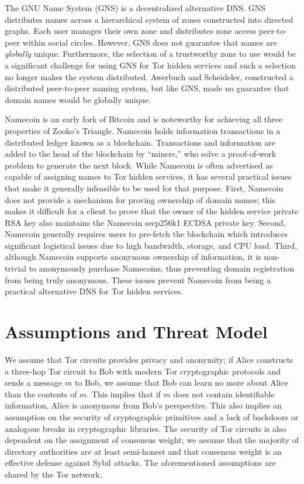 \documentclass[USenglish,oneside,twocolumn]{article}
\begin{document}
The GNU Name System \cite{wachs2014censorship} (GNS) is a decentralized alternative DNS. GNS distributes names across a hierarchical system of zones constructed into directed graphs. Each user manages their own zone and distributes zone access peer-to-peer within social circles. However, GNS does not guarantee that names are \emph{globally} unique. Furthermore, the selection of a trustworthy zone to use would be a significant challenge for using GNS for Tor hidden services and such a selection no longer makes the system distributed. Awerbuch and Scheideler, \cite{awerbuch2004group} constructed a distributed peer-to-peer naming system, but like GNS, made no guarantee that domain names would be globally unique.

Namecoin \cite{NamecoinHome} is an early fork of Bitcoin \cite{nakamoto2008bitcoin} and is noteworthy for achieving all three properties of Zooko's Triangle. Namecoin holds information transactions in a distributed ledger known as a blockchain. Transactions and information are added to the head of the blockchain by ``miners,'' who solve a proof-of-work problem to generate the next block. While Namecoin is often advertised as capable of assigning names to Tor hidden services, it has several practical issues that make it generally infeasible to be used for that purpose. First, Namecoin does not provide a mechanism for proving ownership of domain names; this makes it difficult for a client to prove that the owner of the hidden service private RSA key also maintains the Namecoin secp256k1 ECDSA private key. Second, Namecoin generally requires users to pre-fetch the blockchain which introduces significant logistical issues due to high bandwidth, storage, and CPU load. Third, although Namecoin supports anonymous ownership of information, it is non-trivial to anonymously purchase Namecoins, thus preventing domain registration from being truly anonymous. These issues prevent Namecoin from being a practical alternative DNS for Tor hidden services.


\section{Assumptions and Threat Model}
\label{sec:threatModel}

We assume that Tor circuits provides privacy and anonymity; if Alice constructs a three-hop Tor circuit to Bob with modern Tor cryptographic protocols and sends a message $ m $ to Bob, we assume that Bob can learn no more about Alice than the contents of $ m $. This implies that if $ m $ does not contain identifiable information, Alice is anonymous from Bob's perspective. This also implies an assumption on the security of cryptographic primitives and a lack of backdoors or analogous breaks in cryptographic libraries. The security of Tor circuits is also dependent on the assignment of consensus weight; we assume that the majority of directory authorities are at least semi-honest and that consensus weight is an effective defense against Sybil attacks. The aforementioned assumptions are shared by the Tor network.
\end{document}
